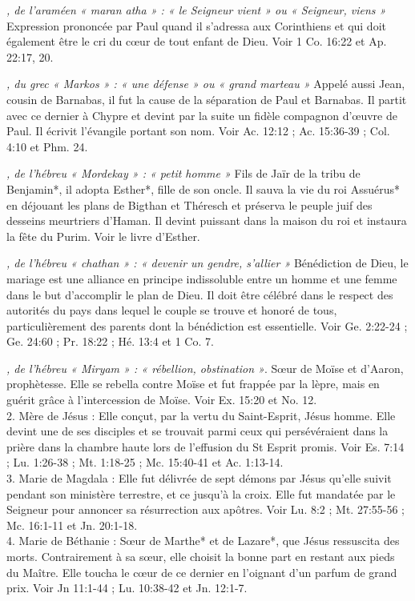 \begin{multicols}{2}
{\textit{, de l'araméen « maran atha » : « le Seigneur vient » ou « Seigneur, viens »}\newline
Expression prononcée par Paul quand il s'adressa aux Corinthiens et qui doit également être le cri du cœur de tout enfant de Dieu. Voir 1 Co. 16:22 et Ap. 22:17, 20.

\textit{, du grec « Markos » : « une défense » ou « grand marteau »}\newline
Appelé aussi Jean, cousin de Barnabas, il fut la cause de la séparation de Paul et Barnabas. Il partit avec ce dernier à Chypre et devint par la suite un fidèle compagnon d'œuvre de Paul. Il écrivit l'évangile portant son nom. Voir Ac. 12:12 ; Ac. 15:36-39 ; Col. 4:10 et Phm. 24.

\textit{, de l'hébreu « Mordekay » : « petit homme »}\newline
Fils de Jaïr de la tribu de Benjamin*, il adopta Esther*, fille de son oncle. Il sauva la vie du roi Assuérus* en déjouant les plans de Bigthan et Théresch et préserva le peuple juif des desseins meurtriers d'Haman. Il devint puissant dans la maison du roi et instaura la fête du Purim. Voir le livre d'Esther.

\textit{, de l'hébreu « chathan » : « devenir un gendre, s'allier »}\newline
Bénédiction de Dieu, le mariage est une alliance en principe indissoluble entre un homme et une femme dans le but d'accomplir le plan de Dieu. Il doit être célébré dans le respect des autorités du pays dans lequel le couple se trouve et honoré de tous, particulièrement des parents dont la bénédiction est essentielle. Voir Ge. 2:22-24 ; Ge. 24:60 ; Pr. 18:22 ; Hé. 13:4 et 1 Co. 7.

\textit{, de l'hébreu « Miryam » : « rébellion, obstination »}. Sœur de Moïse et d'Aaron, prophètesse. Elle se rebella contre Moïse et fut frappée par la lèpre, mais en guérit grâce à l'intercession de Moïse. Voir Ex. 15:20 et No. 12.
\\2. Mère de Jésus : Elle conçut, par la vertu du Saint-Esprit, Jésus homme. Elle devint une de ses disciples et se trouvait parmi ceux qui persévéraient dans la prière dans la chambre haute lors de l'effusion du St Esprit promis. Voir Es. 7:14 ; Lu. 1:26-38 ; Mt. 1:18-25 ; Mc. 15:40-41 et Ac. 1:13-14.
\\3. Marie de Magdala : Elle fut délivrée de sept démons par Jésus qu'elle suivit pendant son ministère terrestre, et ce jusqu'à la croix. Elle fut mandatée par le Seigneur pour annoncer sa résurrection aux apôtres. Voir Lu. 8:2 ; Mt. 27:55-56 ; Mc. 16:1-11 et Jn. 20:1-18.
\\4. Marie de Béthanie : Sœur de Marthe* et de Lazare*, que Jésus ressuscita des morts. Contrairement à sa sœur, elle choisit la bonne part en restant aux pieds du Maître. Elle toucha le cœur de ce dernier en l'oignant d'un parfum de grand prix. Voir Jn 11:1-44 ; Lu. 10:38-42 et Jn. 12:1-7.

}
\end{multicols}
